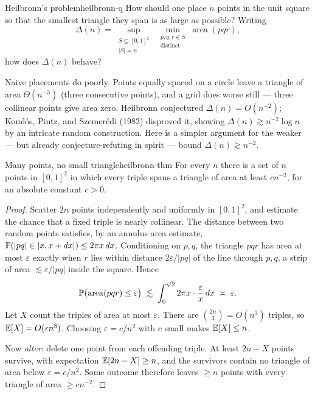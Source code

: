 \begin{question}{Heilbronn's problem}{heilbronn-q}
How should one place $n$ points in the unit square so that the smallest triangle
they span is as large as possible? Writing
\[
  \Delta(n) = \sup_{\substack{S\subseteq[0,1]^2\\|S|=n}}\
  \min_{\substack{p,q,r\in S\\\text{distinct}}} \operatorname{area}(pqr),
\]
how does $\Delta(n)$ behave?
\end{question}

Naive placements do poorly. Points equally spaced on a circle leave a triangle
of area $\Theta(n^{-3})$ (three consecutive points), and a grid does worse
still --- three collinear points give area zero. Heilbronn conjectured
$\Delta(n)=O(n^{-2})$; Koml\'os, Pintz, and Szemer\'edi (1982) disproved it,
showing $\Delta(n)\gtrsim n^{-2}\log n$ by an intricate random construction.
Here is a simpler argument for the weaker --- but already conjecture-refuting in
spirit --- bound $\Delta(n)\gtrsim n^{-2}$.

\begin{theorem}{Many points, no small triangle}{heilbronn-thm}
For every $n$ there is a set of $n$ points in $[0,1]^2$ in which every triple
spans a triangle of area at least $cn^{-2}$, for an absolute constant $c>0$.
\end{theorem}

\begin{proof}
Scatter $2n$ points independently and uniformly in $[0,1]^2$, and estimate the
chance that a fixed triple is nearly collinear. The distance between two random
points satisfies, by an annulus area estimate,
$\mathbb{P}(|pq|\in[x,x+dx])\le 2\pi x\,dx$. Conditioning on $p,q$, the triangle
$pqr$ has area at most $\varepsilon$ exactly when $r$ lies within distance
$2\varepsilon/|pq|$ of the line through $p,q$, a strip of area
$\lesssim \varepsilon/|pq|$ inside the square. Hence
\[
  \mathbb{P}\bigl(\operatorname{area}(pqr)\le\varepsilon\bigr)
  \;\lesssim\;\int_0^{\sqrt2} 2\pi x\cdot\frac{\varepsilon}{x}\,dx
  \;\asymp\;\varepsilon.
\]
Let $X$ count the triples of area at most $\varepsilon$. There are
$\binom{2n}{3}=O(n^3)$ triples, so $\mathbb{E}[X]=O(\varepsilon n^3)$. Choosing
$\varepsilon=c/n^2$ with $c$ small makes $\mathbb{E}[X]\le n$.

Now \emph{alter}: delete one point from each offending triple. At least
$2n-X$ points survive, with expectation $\mathbb{E}[2n-X]\ge n$, and the survivors
contain no triangle of area below $\varepsilon=c/n^2$. Some outcome therefore
leaves $\ge n$ points with every triangle of area $\ge cn^{-2}$.
\end{proof}

